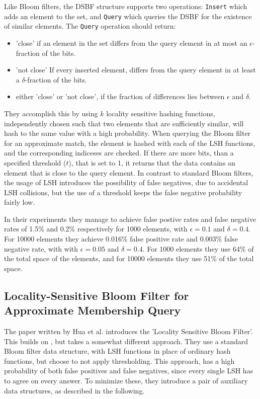 \documentclass[a4paper,11pt]{article}
\begin{document}
Like Bloom filters, the DSBF structure supports two operations:
\texttt{Insert} which adds an element to the set, and \texttt{Query} which queries the DSBF for the existence of similar elements.
The \texttt{Query} operation should return:
\begin{itemize}
\item 'close' if an element in the set differs from the query element in at most an $\epsilon$-fraction of the bits.
\item 'not close' If every inserted element, differs from the query element in at least a $\delta$-fraction of the bits.
\item either 'close' or 'not close', if the fraction of differences lies between $\epsilon$ and $\delta$.
\end{itemize}

They accomplish this by using $k$ locality sensitive hashing functions, independently chosen such that two elements that are sufficiently similar, will hash to the same value with a high probability.
When querying the Bloom filter for an approximate match, the element is hashed with each of the LSH functions, and the corresponding indiceses are checked. If there are more bits, than a specified threshold ($t$), that is set to 1, it returns that the data contains an element that is close to the query element. In contrast to standard Bloom filters, the usage of LSH introduces the possibility of false negatives, due to accidental LSH collisions, but the use of a threshold keeps the false negative probability fairly low.

In their experiments they manage to achieve false postive rates and false negative rates of 1.5\% and 0.2\% respectively for 1000 elements, with $\epsilon = 0.1$ and $\delta = 0.4$. For 10000 elements they achieve 0.016\% false positive rate and 0.003\% false negative rate, with with $\epsilon = 0.05$ and $\delta = 0.4$. For 1000 elements they use 64\% of the total space of the elements, and for 10000 elements they use 51\% of the total space.

\subsection{Locality-Sensitive Bloom Filter for Approximate Membership Query}
The paper written by Hua et al.\cite{paper:hua} introduces the 'Locality Sensitive Bloom Filter'. This builds on \cite{paper:harvard}, but takes a somewhat different approach. They use a standard Bloom filter data structure, with LSH functions in place of ordinary hash functions, but choose to not apply thresholding. This approach, has a high probability of both false positives and false negatives, since every single LSH has to agree on every answer. To minimize these, they introduce a pair of auxiliary data structures, as described in the following.
\end{document}
